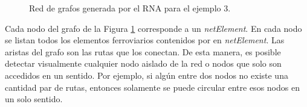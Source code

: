 \begin{figure}[H]
		\centering\caption{Red de grafos generada por el RNA para el ejemplo 3.}
		\label{fig:EJ3_8}
	\end{figure}
	
	Cada nodo del grafo de la Figura \ref{fig:EJ3_8} corresponde a un \textit{netElement}. En cada nodo se listan todos los elementos ferroviarios contenidos por en \textit{netElement}. Las aristas del grafo son las rutas que los conectan. De esta manera, es posible detectar visualmente cualquier nodo aislado de la red o nodos que solo son accedidos en un sentido. Por ejemplo, si algún entre dos nodos no existe una cantidad par de rutas, entonces solamente se puede circular entre esos nodos en un solo sentido.